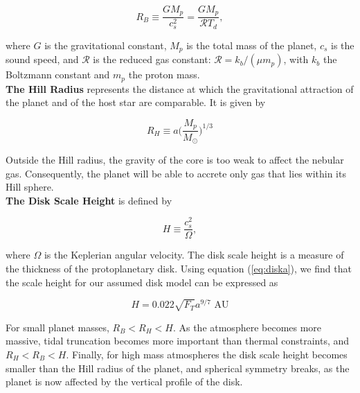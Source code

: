 \documentclass[apj]{emulateapj}
\begin{document}
\begin{equation}
\label{eq:RB}
R_B \equiv \frac{G M_p}{c_s^2}=\frac{G M_p}{\mathcal{R} T_d},
\end{equation}

\noindent where $G$ is the gravitational constant, $M_p$ is the total mass of the planet, $c_s$ is the sound speed, and $\mathcal{R}$ is the reduced gas constant: $\mathcal{R}=k_b/(\mu m_p)$, with $k_b$ the Boltzmann constant and $m_p$ the proton mass. \\


\textbf{The Hill Radius} represents the distance at which the gravitational attraction of the planet and of the host star are comparable. It is given by

\begin{equation}
\label{eq:RHill}
R_H \equiv a \Big(\frac{M_p}{M_{\odot}}\Big)^{1/3}
\end{equation}

\noindent Outside the Hill radius, the gravity of the core is too weak to affect the nebular gas. Consequently, the planet will be able to accrete only gas that lies within its Hill sphere. \\

\textbf{The Disk Scale Height} is defined by

\begin{equation}
\label{eq:H}
H \equiv \frac{c_s^2}{\Omega},
\end{equation}

\noindent where $\Omega$ is the Keplerian angular velocity. The disk scale height is a measure of the thickness of the protoplanetary disk. Using equation (\ref{eq:diska}), we find that the scale height for our assumed disk model can be expressed as

\begin{equation}
\label{eq:H2}
H=0.022 \sqrt{F_T} a^{9/7} \,\, \mathrm{AU}
\end{equation}

For small planet masses, $R_B<R_H<H$. As the atmosphere becomes more massive, tidal truncation becomes more important than thermal constraints, and $R_H<R_B<H$. Finally, for high mass atmospheres the disk scale height becomes smaller than the Hill radius of the planet, and spherical symmetry breaks, as the planet is now affected by the vertical profile of the disk.

\end{document}
